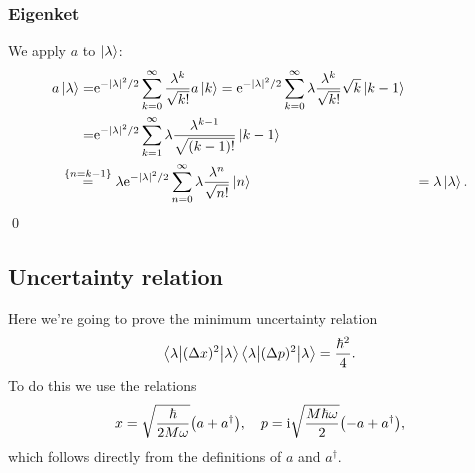 \documentclass[11pt,letter, swedish, english
]{article}
\begin{document}
\subsubsection{Eigenket}
We apply $a$ to $\ket\lambda$:
\begin{equation}\label{eq:2_eigenket}
\begin{aligned}
a\ket\lambda =& \ee^{-|\lambda|^2/2}\sum_{k=0}^\infty
\frac{\lambda^k}{\sqrt{k!}} a \ket{k}
= \ee^{-|\lambda|^2/2}\sum_{k=0}^\infty
\lambda\frac{\lambda^{k}}{\sqrt{k!}}\sqrt{k} \ket{k-1}\\
=& \ee^{-|\lambda|^2/2}\sum_{k=1}^\infty
\lambda\frac{\lambda^{k-1}}{\sqrt{(k-1)!}} \ket{k-1}\\
&\hspace{-24pt}\stackrel{\{n=k-1\}}{=} \lambda \ee^{-|\lambda|^2/2}\sum_{n=0}^\infty
\lambda\frac{\lambda^{n}}{\sqrt{n!}} \ket{n}
&=\lambda\ket{\lambda}.
\end{aligned}
\end{equation}
\qed

\subsection{Uncertainty relation}
Here we're going to prove the minimum uncertainty relation
\begin{equation}\label{eq:2_unc}
\ev**{(\Delta{x})^2}{\lambda}\ev**{(\Delta{p})^2}{\lambda}
=\frac{\hbar^2}{4}.
\end{equation}
To do this we use the relations
\begin{equation}\label{eq:2_xp}
x=\sqrt{\frac{\hbar}{2M\omega}}\qty(a+a^\dagger)\qcomma
p=\ii\sqrt{\frac{M\hbar\omega}{2}}\qty(-a+a^\dagger),
\end{equation}
which follows directly from the definitions of $a$ and $a^\dagger$.
\end{document}
